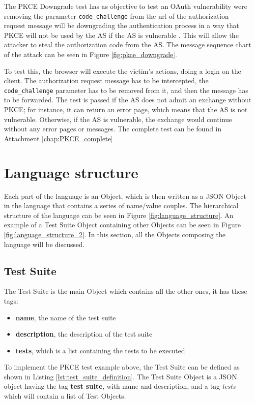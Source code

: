 The \gls{PKCE} Downgrade test has as objective to test an \gls{OAuth} vulnerability were removing the parameter \texttt{code\_challenge} from the url of the authorization request message will be downgrading the authentication process in a way that \gls{PKCE} will not be used by the AS if the AS is vulnerable \cite{pkce_downgrade}. This will allow the attacker to steal the authorization code from the AS. The message sequence chart of the attack can be seen in Figure \ref{fig:pkce_downgrade}.

To test this, the browser will execute the victim's actions, doing a login on the client. The authorization request message has to be intercepted, the \texttt{code\_challenge} parameter has to be removed from it, and then the message has to be forwarded. The test is passed if the AS does not admit an exchange without PKCE; for instance, it can return an error page, which means that the AS is not vulnerable. Otherwise, if the AS is vulnerable, the exchange would continue without any error pages or messages.
The complete test can be found in Attachment \ref{chap:PKCE_complete}


\section{Language structure}
Each part of the language is an Object, which is then written as a JSON Object in the language that contains a series of name/value couples. The hierarchical structure of the language can be seen in Figure \ref{fig:language_structure}. An example of a Test Suite Object containing other Objects can be seen in Figure \ref{fig:language_structure_2}. In this section, all the Objects composing the language will be discussed.\\

\subsection{Test Suite}
The Test Suite is the main Object which contains all the other ones, it has these tags:

\begin{itemize}
    \item \textbf{name}, the name of the test suite
    \item \textbf{description}, the description of the test suite
    \item \textbf{tests}, which is a list containing the tests to be executed
\end{itemize}
To implement the \gls{PKCE} test example above, the Test Suite can be defined as shown in Listing \ref{lst:test_suite_definition}. The Test Suite Object is a JSON object having the tag \textbf{test suite}, with name and description, and a tag \textit{tests} which will contain a list of Test Objects.

